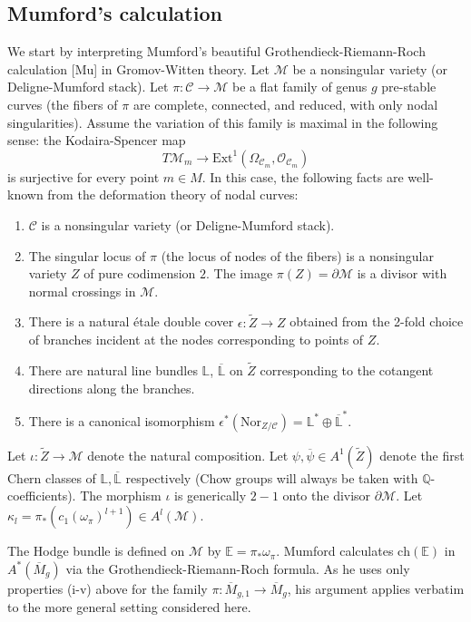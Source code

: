 \documentclass[11 pt]{amsart}
\newcommand{\rarr}{\rightarrow}
\newcommand{\oh}{{\mathcal{O}}}
\newcommand{\Q}{\mathbb{Q}}
\newcommand{\LL}{\mathbb{L}}
\newcommand{\hodge}{\mathbb{E}}
\newcommand{\ch}{\text{ch}}
\newcommand{\CM}{\mathcal{M}}
\newcommand{\UM}{\mathcal{C}}
\begin{document}
\subsection{Mumford's calculation}
We start by interpreting  Mumford's 
beautiful Grothendieck-Riemann-Roch calculation  [Mu]
in Gromov-Witten theory.
Let $\CM$ be a nonsingular variety (or Deligne-Mumford stack).
Let $\pi:\UM\rarr \CM$ be a flat family of genus $g$ pre-stable
curves (the fibers of $\pi$ are complete, connected, and
reduced, with
only nodal singularities). Assume the variation of this
family is maximal in the following sense:
the Kodaira-Spencer map
\begin{equation}
\label{asss} 
T\CM_m \rarr \text{Ext}^1(\Omega_{\UM_m}, \oh_{\UM_m})
\end{equation}
is surjective for every point $m\in M$.
In this case, the following facts are well-known
from the deformation theory of nodal curves:
\begin{enumerate}
\item[(i)] $\UM$ is a nonsingular variety (or Deligne-Mumford stack).
\item[(ii)] The singular locus of $\pi$ 
(the locus of nodes of the fibers) is a nonsingular
variety $Z$ of pure codimension $2$.
The image $\pi(Z)=\partial \CM$ is a divisor with normal crossings in $\CM$.
\item[(iii)] There is a natural \'etale double cover
$\epsilon:\tilde{Z} \rarr Z$ obtained from the 2-fold choice of
branches incident at the nodes corresponding to points of $Z$.
\item[(iv)] There are natural line bundles
$\LL$, $\overline{\LL}$ on $\tilde{Z}$
corresponding to the cotangent directions
along the branches.
\item[(v)] There is a canonical isomorphism  $\epsilon^*(\text{Nor}_{Z/\UM})
= \LL^* \oplus \overline{\LL}^*$. 
\end{enumerate}
Let $\iota: \tilde{Z} \rarr \CM$ denote the
natural composition. Let $\psi, \overline{\psi} \in A^1(\tilde{Z})$ denote
the first Chern classes of $\LL, \overline{\LL}$ respectively (Chow
groups will always be taken with $\Q$-coefficients).
The morphism $\iota$ is generically $2-1$ onto the
divisor $\partial \CM$. Let $\kappa_l=
\pi_*(c_1(\omega_\pi)^{l+1})\in
A^l(\CM)$.

The Hodge bundle
 is defined  on $\CM$ by $\hodge=\pi_* \omega_\pi$.
Mumford calculates $\ch (\hodge)$ in $A^*(\overline{M}_g)$ via the
Grothendieck-Riemann-Roch formula. 
As he uses only properties (i-v) above for the family
$\pi: \overline{M}_{g,1} \rarr \overline{M}_g$, 
his argument applies verbatim to the more general
setting considered here.
\end{document}
